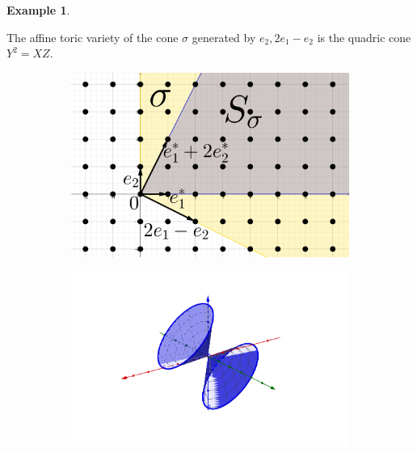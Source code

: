 \documentclass[12pt]{article}
\theoremstyle{definition}
\newtheorem*{example}{Example}
\begin{document}
\begin{example}
\begin{enumerate}[label=\arabic*)]
The affine toric variety of the cone $\sigma$ generated by $e_2,2e_1-e_2$ is the quadric cone $Y^2=XZ$.
\begin{figure}[ht!]
\begin{center}
\begin{subfigure}{.35\textwidth}
\includegraphics[scale=0.6]{Pictures/Cone.png}
\end{subfigure}
\begin{subfigure}{.35\textwidth}
\includegraphics[scale=0.29]{Pictures/Variety.png}
\end{subfigure}
\end{center}
\end{figure}
%
%

\end{enumerate}
\end{example}
\end{document}
